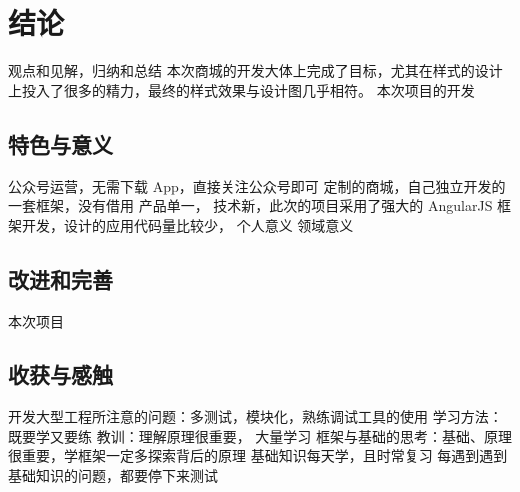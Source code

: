\chapter{结论}
  \label{chap:结论}
    观点和见解，归纳和总结
    本次商城的开发大体上完成了目标，尤其在样式的设计上投入了很多的精力，最终的样式效果与设计图几乎相符。
    本次项目的开发

\section{特色与意义}
  \label{sec:特色与意义}
    公众号运营，无需下载 App，直接关注公众号即可
    定制的商城，自己独立开发的一套框架，没有借用
    产品单一，
    技术新，此次的项目采用了强大的 AngularJS 框架开发，设计的应用代码量比较少，
    个人意义
    领域意义

\section{改进和完善}
  \label{sec:改进和完善}
    本次项目

\section{收获与感触}
  \label{sec:收获与感触}
  开发大型工程所注意的问题：多测试，模块化，熟练调试工具的使用
  学习方法：既要学又要练
  教训：理解原理很重要，
  大量学习
  框架与基础的思考：基础、原理很重要，学框架一定多探索背后的原理
    基础知识每天学，且时常复习
    每遇到遇到基础知识的问题，都要停下来测试
